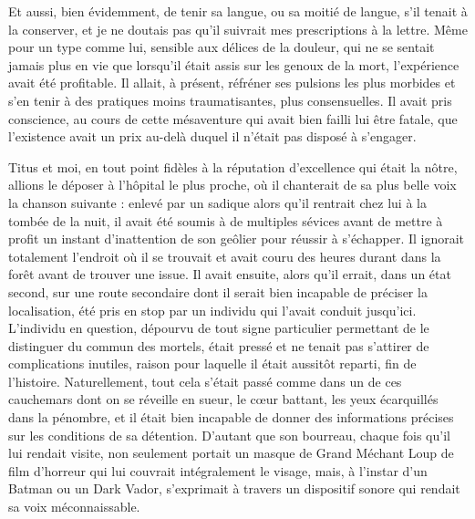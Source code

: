 Et aussi, bien évidemment, de tenir sa langue, ou sa moitié de langue, s’il tenait à la conserver, et je ne doutais pas qu’il suivrait mes prescriptions à la lettre. Même pour un type comme lui, sensible aux délices de la douleur, qui ne se sentait jamais plus en vie que lorsqu’il était assis sur les genoux de la mort, l’expérience avait été profitable. Il allait, à présent, réfréner ses pulsions les plus morbides et s’en tenir à des pratiques moins traumatisantes, plus consensuelles. Il avait pris conscience, au cours de cette mésaventure qui avait bien failli lui être fatale, que l’existence avait un prix au-delà duquel il n’était pas disposé à s’engager.

Titus et moi, en tout point fidèles à la réputation d’excellence qui était la nôtre, allions le déposer à l’hôpital le plus proche, où il chanterait de sa plus belle voix la chanson suivante : enlevé par un sadique alors qu’il rentrait chez lui à la tombée de la nuit, il avait été soumis à de multiples sévices avant de mettre à profit un instant d’inattention de son geôlier pour réussir à s’échapper. Il ignorait totalement l’endroit où il se trouvait et avait couru des heures durant dans la forêt avant de trouver une issue. Il avait ensuite, alors qu’il errait, dans un état second, sur une route secondaire dont il serait bien incapable de préciser la localisation, été pris en stop par un individu qui l’avait conduit jusqu’ici. L’individu en question, dépourvu de tout signe particulier permettant de le distinguer du commun des mortels, était pressé et ne tenait pas s’attirer de complications inutiles, raison pour laquelle il était aussitôt reparti, fin de l’histoire. Naturellement, tout cela s’était passé comme dans un de ces cauchemars dont on se réveille en sueur, le cœur battant, les yeux écarquillés dans la pénombre, et il était bien incapable de donner des informations précises sur les conditions de sa détention. D’autant que son bourreau, chaque fois qu’il lui rendait visite, non seulement portait un masque de Grand Méchant Loup de film d’horreur qui lui couvrait intégralement le visage, mais, à l’instar d’un Batman ou un Dark Vador, s’exprimait à travers un dispositif sonore qui rendait sa voix méconnaissable.

